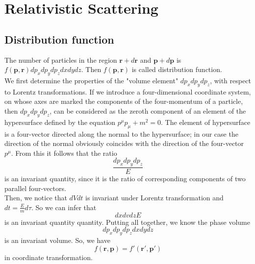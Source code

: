 \documentclass[cyan]{elegantnote}
\begin{document}
\section{Relativistic Scattering}
\subsection{Distribution function}
The number of particles in the region $\bm{r}+d\bm{r}$ and $\bm{p} + d\bm{p}$ is $f(\bm{p},\bm{r})dp_x dp_y dp_z dx dy dz$. Then  $f(\bm{p},\bm{r})$ is called distribution function.\\
We first determine the properties of the "volume element" $dp_x dp_y dp_z$, with respect to Lorentz transformations. If we introduce a four-dimensional coordinate system, on whose axes are marked the components of the four-momentum of a particle, then $dp_x dp_y dp_z$, can be considered as the zeroth component of an element of the hypersurface defined by the equation $p^{\mu}p_{\mu} + m^2 = 0$. The element of hypersurface is a four-vector directed along the normal to the hypersurface; in our case the direction of the normal obviously coincides with the direction of the four-vector $p^{\mu}$. From this it follows that the ratio
\[\frac{dp_x dp_y dp_z}{E}\]
is an invariant quantity, since it is the ratio of corresponding components of two parallel four-vectors.\\
Then, we notice that $dVdt$ is invariant under Lorentz transformation and $dt = \frac{E}{m} d\tau $. So we can infer that
\[dx dv dz E\]
is an invariant quantity quantity. Putting all together, we know the phase volume
\[dp_x dp_y dp_z dx dy dz\]
is an invariant volume. So, we have
\[f(\bm{r},\bm{p}) = f'(\bm{r}',\bm{p}')\]
in coordinate transformation.
\end{document}
